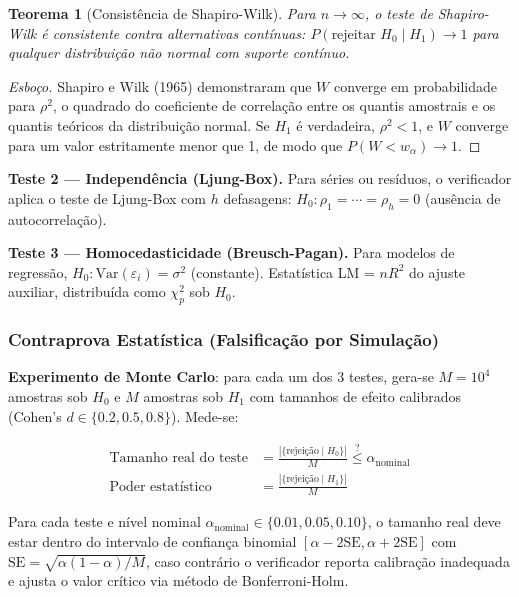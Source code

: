 \documentclass[5p]{elsarticle}
\newtheorem{theorem}{Teorema}[section]
\theoremstyle{remark}
\begin{document}
\begin{theorem}[Consistência de Shapiro-Wilk]
Para $n \to \infty$, o teste de Shapiro-Wilk é consistente contra alternativas contínuas: $P(\text{rejeitar } H_0 \mid H_1) \to 1$ para qualquer distribuição não normal com suporte contínuo.
\end{theorem}

\begin{proof}[Esboço]
Shapiro e Wilk (1965) demonstraram que $W$ converge em probabilidade para $\rho^2$, o quadrado do coeficiente de correlação entre os quantis amostrais e os quantis teóricos da distribuição normal. Se $H_1$ é verdadeira, $\rho^2 < 1$, e $W$ converge para um valor estritamente menor que 1, de modo que $P(W < w_\alpha) \to 1$.
\end{proof}

\textbf{Teste 2 --- Independência (Ljung-Box).} Para séries ou resíduos, o verificador aplica o teste de Ljung-Box com $h$ defasagens: $H_0: \rho_1 = \cdots = \rho_h = 0$ (ausência de autocorrelação).

\textbf{Teste 3 --- Homocedasticidade (Breusch-Pagan).} Para modelos de regressão, $H_0: \text{Var}(\varepsilon_i) = \sigma^2$ (constante). Estatística LM = $nR^2$ do ajuste auxiliar, distribuída como $\chi^2_{p}$ sob $H_0$.

\subsubsection{Contraprova Estatística (Falsificação por Simulação)}

\textbf{Experimento de Monte Carlo}: para cada um dos 3 testes, gera-se $M = 10^4$ amostras sob $H_0$ e $M$ amostras sob $H_1$ com tamanhos de efeito calibrados (Cohen's $d \in \{0.2, 0.5, 0.8\}$). Mede-se:

\begin{align}
\text{Tamanho real do teste} &= \frac{|\{\text{rejeição} \mid H_0\}|}{M} \stackrel{?}{\leq} \alpha_{\text{nominal}} \\
\text{Poder estatístico} &= \frac{|\{\text{rejeição} \mid H_1\}|}{M}
\label{eq:c4_power}
\end{align}

Para cada teste e nível nominal $\alpha_{\text{nominal}} \in \{0.01, 0.05, 0.10\}$, o tamanho real deve estar dentro do intervalo de confiança binomial $[\alpha - 2\text{SE}, \alpha + 2\text{SE}]$ com $\text{SE} = \sqrt{\alpha(1-\alpha)/M}$, caso contrário o verificador reporta calibração inadequada e ajusta o valor crítico via método de Bonferroni-Holm.
\end{document}
